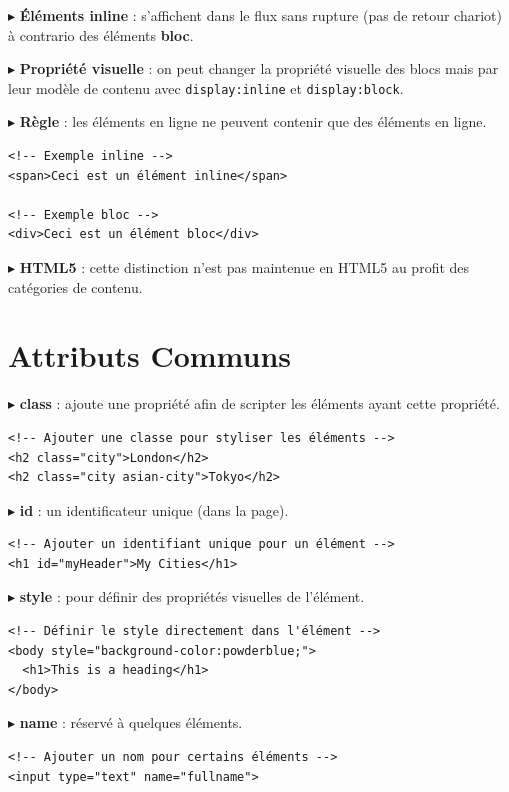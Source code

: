 \documentclass{report}
\begin{document}
\begin{multicols*}{2}
$\blacktriangleright$ \textbf{Éléments inline} : s'affichent dans le flux sans rupture 
(pas de retour chariot) à contrario des éléments \textbf{bloc}.

$\blacktriangleright$ \textbf{Propriété visuelle} : on peut changer la propriété visuelle 
des blocs mais par leur modèle de contenu avec \texttt{display:inline} et \texttt{display:block}.

$\blacktriangleright$ \textbf{Règle} : les éléments en ligne ne peuvent contenir que des 
éléments en ligne.

\begin{lstlisting}[style=HTMLDraculaDark]
<!-- Exemple inline -->
<span>Ceci est un élément inline</span>

<!-- Exemple bloc -->
<div>Ceci est un élément bloc</div>
\end{lstlisting}

$\blacktriangleright$ \textbf{HTML5} : cette distinction n’est pas maintenue en HTML5 au 
profit des catégories de contenu.



\section{Attributs Communs}

$\blacktriangleright$ \textbf{class} : ajoute une propriété afin de scripter les éléments 
ayant cette propriété.
\begin{lstlisting}[style=HTMLDraculaDark]
<!-- Ajouter une classe pour styliser les éléments -->
<h2 class="city">London</h2>
<h2 class="city asian-city">Tokyo</h2>
\end{lstlisting}

$\blacktriangleright$ \textbf{id} : un identificateur unique (dans la page).
\begin{lstlisting}[style=HTMLDraculaDark]
<!-- Ajouter un identifiant unique pour un élément -->
<h1 id="myHeader">My Cities</h1>
\end{lstlisting}

$\blacktriangleright$ \textbf{style} : pour définir des propriétés visuelles de l’élément.
\begin{lstlisting}[style=HTMLDraculaDark]
<!-- Définir le style directement dans l'élément -->
<body style="background-color:powderblue;">
  <h1>This is a heading</h1>
</body>
\end{lstlisting}

$\blacktriangleright$ \textbf{name} : réservé à quelques éléments.
\begin{lstlisting}[style=HTMLDraculaDark]
<!-- Ajouter un nom pour certains éléments -->
<input type="text" name="fullname">
\end{lstlisting}




\end{multicols*}
\end{document}
